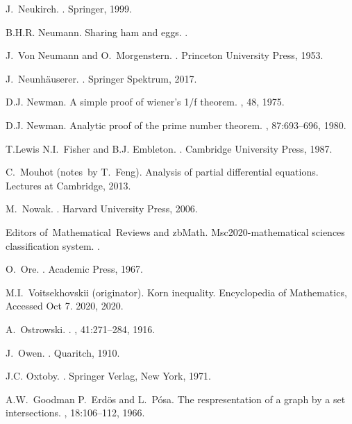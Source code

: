 \documentclass[12pt]{amsart}
\begin{document}
\begin{thebibliography}{100}
J.~Neukirch.
.
\newblock Springer, 1999.

B.H.R. Neumann.
\newblock Sharing ham and eggs.
.

J.~Von Neumann and O.~Morgenstern.
.
\newblock Princeton University Press, 1953.

J.~Neunh{\"a}userer.
.
\newblock Springer Spektrum, 2017.

D.J. Newman.
\newblock A simple proof of wiener's 1/f theorem.
, 48, 1975.

D.J. Newman.
\newblock Analytic proof of the prime number theorem.
, 87:693--696, 1980.

T.Lewis N.I.~Fisher and B.J. Embleton.
.
\newblock Cambridge University Press, 1987.

C.~Mouhot (notes~by T.~Feng).
\newblock Analysis of partial differential equations.
\newblock Lectures at Cambridge, 2013.

M.~Nowak.
.
\newblock Harvard University Press, 2006.

Editors of~Mathematical~Reviews and zbMath.
\newblock Msc2020-mathematical sciences classification system.
.

O.~Ore.
.
\newblock Academic Press, 1967.

M.I.~Voitsekhovskii (originator).
\newblock Korn inequality.
\newblock Encyclopedia of Mathematics, Accessed Oct 7. 2020, 2020.

A.~Ostrowski.
.
, 41:271--284, 1916.

J.~Owen.
.
\newblock Quaritch, 1910.

J.C. Oxtoby.
.
\newblock Springer Verlag, New York, 1971.

A.W.~Goodman P.~Erd\"os and L.~P\'osa.
\newblock The respresentation of a graph by a set intersections.
, 18:106--112, 1966.


\end{thebibliography}
\end{document}
